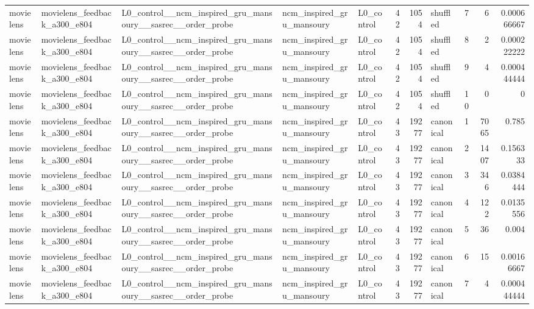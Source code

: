 \begin{table}[htbp!]
\begin{tabular}{lllllrrlrrr}
movielens & movielens\_feedback\_a300\_e804 & L0\_control\_\_ncm\_inspired\_gru\_mansoury\_\_sasrec\_\_order\_probe & ncm\_inspired\_gru\_mansoury & L0\_control & 42 & 1054 & shuffled & 7 & 6 & 0.000666667 \\
movielens & movielens\_feedback\_a300\_e804 & L0\_control\_\_ncm\_inspired\_gru\_mansoury\_\_sasrec\_\_order\_probe & ncm\_inspired\_gru\_mansoury & L0\_control & 42 & 1054 & shuffled & 8 & 2 & 0.000222222 \\
movielens & movielens\_feedback\_a300\_e804 & L0\_control\_\_ncm\_inspired\_gru\_mansoury\_\_sasrec\_\_order\_probe & ncm\_inspired\_gru\_mansoury & L0\_control & 42 & 1054 & shuffled & 9 & 4 & 0.000444444 \\
movielens & movielens\_feedback\_a300\_e804 & L0\_control\_\_ncm\_inspired\_gru\_mansoury\_\_sasrec\_\_order\_probe & ncm\_inspired\_gru\_mansoury & L0\_control & 42 & 1054 & shuffled & 10 & 0 & 0 \\
movielens & movielens\_feedback\_a300\_e804 & L0\_control\_\_ncm\_inspired\_gru\_mansoury\_\_sasrec\_\_order\_probe & ncm\_inspired\_gru\_mansoury & L0\_control & 43 & 19277 & canonical & 1 & 7065 & 0.785 \\
movielens & movielens\_feedback\_a300\_e804 & L0\_control\_\_ncm\_inspired\_gru\_mansoury\_\_sasrec\_\_order\_probe & ncm\_inspired\_gru\_mansoury & L0\_control & 43 & 19277 & canonical & 2 & 1407 & 0.156333 \\
movielens & movielens\_feedback\_a300\_e804 & L0\_control\_\_ncm\_inspired\_gru\_mansoury\_\_sasrec\_\_order\_probe & ncm\_inspired\_gru\_mansoury & L0\_control & 43 & 19277 & canonical & 3 & 346 & 0.0384444 \\
movielens & movielens\_feedback\_a300\_e804 & L0\_control\_\_ncm\_inspired\_gru\_mansoury\_\_sasrec\_\_order\_probe & ncm\_inspired\_gru\_mansoury & L0\_control & 43 & 19277 & canonical & 4 & 122 & 0.0135556 \\
movielens & movielens\_feedback\_a300\_e804 & L0\_control\_\_ncm\_inspired\_gru\_mansoury\_\_sasrec\_\_order\_probe & ncm\_inspired\_gru\_mansoury & L0\_control & 43 & 19277 & canonical & 5 & 36 & 0.004 \\
movielens & movielens\_feedback\_a300\_e804 & L0\_control\_\_ncm\_inspired\_gru\_mansoury\_\_sasrec\_\_order\_probe & ncm\_inspired\_gru\_mansoury & L0\_control & 43 & 19277 & canonical & 6 & 15 & 0.00166667 \\
movielens & movielens\_feedback\_a300\_e804 & L0\_control\_\_ncm\_inspired\_gru\_mansoury\_\_sasrec\_\_order\_probe & ncm\_inspired\_gru\_mansoury & L0\_control & 43 & 19277 & canonical & 7 & 4 & 0.000444444 \\

\end{tabular}
\end{table}
